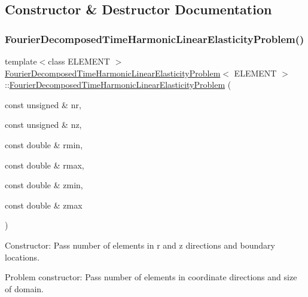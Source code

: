 \subsection{Constructor \& Destructor Documentation}
\mbox{\label{classFourierDecomposedTimeHarmonicLinearElasticityProblem_a52597ec969cbd2aaa9fde263594c1c32}} 
\subsubsection{\texorpdfstring{Fourier\+Decomposed\+Time\+Harmonic\+Linear\+Elasticity\+Problem()}{FourierDecomposedTimeHarmonicLinearElasticityProblem()}\hspace{0.1cm}{\footnotesize\ttfamily [1/3]}}
{\footnotesize\ttfamily template$<$class E\+L\+E\+M\+E\+NT $>$ \\
\hyperlink{classFourierDecomposedTimeHarmonicLinearElasticityProblem}{Fourier\+Decomposed\+Time\+Harmonic\+Linear\+Elasticity\+Problem}$<$ E\+L\+E\+M\+E\+NT $>$\+::\hyperlink{classFourierDecomposedTimeHarmonicLinearElasticityProblem}{Fourier\+Decomposed\+Time\+Harmonic\+Linear\+Elasticity\+Problem} (\begin{DoxyParamCaption}\item[{const unsigned \&}]{nr,  }\item[{const unsigned \&}]{nz,  }\item[{const double \&}]{rmin,  }\item[{const double \&}]{rmax,  }\item[{const double \&}]{zmin,  }\item[{const double \&}]{zmax }\end{DoxyParamCaption})}



Constructor\+: Pass number of elements in r and z directions and boundary locations. 

Problem constructor\+: Pass number of elements in coordinate directions and size of domain. 

